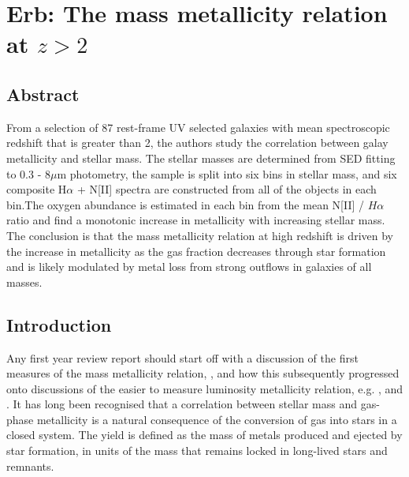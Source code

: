 \documentclass{literature}
\begin{document}


\section{Erb: The mass metallicity relation at $z > 2$}\label{sec:erb}
\subsection{Abstract}
\citep{Erb_2006} From a selection of 87 rest-frame UV selected galaxies with mean spectroscopic redshift that is greater than 2, the authors study the correlation between galay metallicity and stellar mass. The stellar masses are determined from SED fitting to 0.3 - 8$\mu$m photometry, the sample is split into six bins in stellar mass, and six composite H$\alpha$ + N[II] spectra are constructed from all of the objects in each bin.The oxygen abundance is estimated in each bin from the mean N[II] / $H\alpha$ ratio and find a monotonic increase in metallicity with increasing stellar mass. The conclusion is that the mass metallicity relation at high redshift is driven by the increase in metallicity as the gas fraction decreases through star formation and is likely modulated by metal loss from strong outflows in galaxies of all masses.

\subsection{Introduction}
Any first year review report should start off with a discussion of the first measures of the mass metallicity relation, \citep{Lequeux_1979}, and how this subsequently progressed onto discussions of the easier to measure luminosity metallicity relation, e.g. \citep{Zaritsky_1994}, \citep{Skillman_1989} and \citep{Salzer_2005}. It has long been recognised that a correlation between stellar mass and gas-phase metallicity is a natural consequence of the conversion of gas into stars in a closed system. The yield is defined as the mass of metals produced and ejected by star formation, in units of the mass that remains locked in long-lived stars and remnants.
\end{document}
